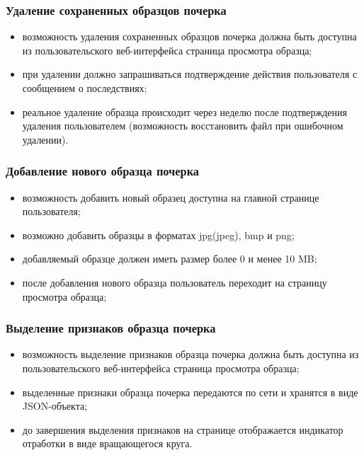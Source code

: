 \subsubsection{Удаление сохраненных образцов почерка}
\label{sec:freq:delete}
\begin{itemize}
	\item возможность удаления сохраненных образцов почерка должна быть доступна из пользовательского веб-интерфейса страница просмотра образца;
	\item при удалении должно запрашиваться подтверждение действия пользователя с сообщением о последствиях;
	\item реальное удаление образца происходит через неделю после подтверждения удаления пользователем (возможность восстановить файл при ошибочном удалении).
\end{itemize}

\subsubsection{Добавление нового образца почерка}
\label{sec:freq:add}
\begin{itemize}
	\item возможность добавить новый образец доступна на главной странице пользователя;
	\item возможно добавить образцы в форматах jpg(jpeg), bmp и png;
	\item добавляемый образце должен иметь размер более 0 и менее 10 MB;
	\item после добавления нового образца пользователь переходит на страницу просмотра образца;
\end{itemize}

\subsubsection{Выделение признаков образца почерка}
\label{sec:freq:extract_features}
\begin{itemize}
	\item возможность выделение признаков образца почерка должна быть доступна из пользовательского веб-интерфейса страница просмотра образца;
	\item выделенные признаки образца почерка передаются по сети и хранятся в виде JSON-объекта;
	\item до завершения выделения признаков на странице отображается индикатор отработки в виде вращающегося круга.
\end{itemize}

